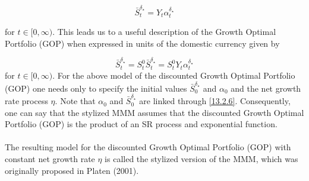 \documentclass[a4 paper, 12pt]{report}
\theoremstyle{plain}
\begin{document}
\begin{equation}\label{13.2.7}
\bar{S}_t^{\delta_\star} = Y_t\alpha_t^{\delta_\star}
\end{equation}

for $t\in[0,\infty)$. This leads us to a useful description of the Growth Optimal Portfolio (GOP) when expressed in units of the domestic currency given by 

\begin{equation}\label{13.2.8}
\bar{S}_t^{\delta_\star} = S_t^0\bar{S}_t^{\delta_\star} = S_t^0 Y_t\alpha_t^{\delta_\star}
\end{equation}
for $t\in[0,\infty)$. For the above model of the discounted Growth Optimal Portfolio (GOP) one needs only to specify the initial values $\bar{S}_0^{\delta_\star}$ and $\alpha_0$ and the net growth rate process $\eta$. Note that $\alpha_0$ and $\bar{S}_0^{\delta_\star}$ are linked through \eqref{13.2.6}. Consequently, one can say that the stylized MMM assumes that the discounted Growth Optimal Portfolio (GOP) is the product of an SR process and exponential function.\\\\
The resulting model for the discounted Growth Optimal Portfolio (GOP) with constant net growth rate $\eta$ is called the stylized version of the
MMM, which was originally proposed in Platen (2001).

\end{document}
